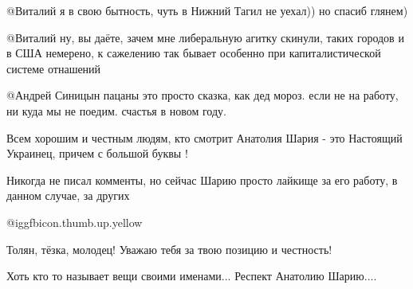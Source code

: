 \begin{multicols}{2}
\begin{itemize}
 @Виталий  я в свою бытность, чуть в Нижний Тагил не уехал)) но спасиб глянем)

 @Виталий  ну, вы даёте, зачем мне либеральную агитку скинули, таких городов и
 в США немерено, к сажелению так бывает особенно при капиталистической системе
 отнашений

 @Андрей Синицын  пацаны это просто сказка, как дед мороз. если не на работу,
 ни куда мы не поедим. счастья в новом году.
\end{itemize} %

Всем хорошим и честным людям, кто смотрит Анатолия Шария - это Настоящий
Украинец, причем с большой буквы !

Никогда не писал комменты, но сейчас Шарию просто лайкище за его работу, в
данном случае, за других

 @igg{fbicon.thumb.up.yellow} 

Толян, тёзка, молодец! Уважаю тебя за твою позицию и честность!

Хоть кто то называет вещи своими именами... Респект Анатолию Шарию....

\end{multicols} %



